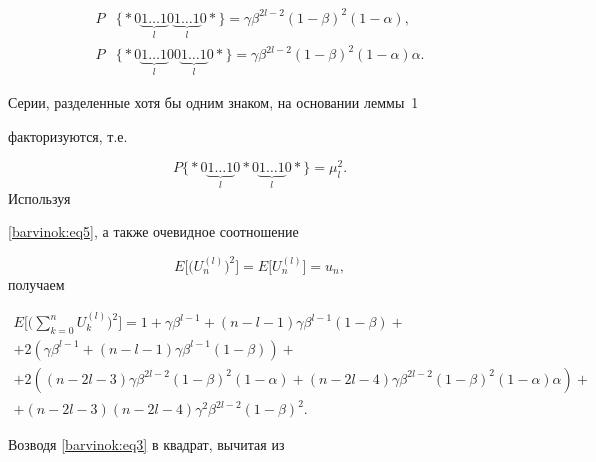 \begin{equation}

\label{barvinok:eq5}

\begin{aligned}

 P & \bigl\{ \ast 0\underbrace {1\ldots 1}_l0\underbrace {1\ldots 1}_l0\ast

\bigr\}=\gamma \beta ^{2l-2}(1-\beta)^2 (1-\alpha ), \\

 P & \bigl\{ \ast 0\underbrace {1 \ldots 1}_l00\underbrace {1\ldots 1}_l0\ast

\bigr\}=\gamma \beta ^{2l-2}(1-\beta)^2 (1-\alpha)\alpha.

\end{aligned}

\end{equation}

Серии, разделенные хотя бы одним знаком, на основании леммы~1

факторизуются, т.е. 

$$P\bigl\{ \ast 0\underbrace {1\ldots 1}_l0\ast

0\underbrace {1\ldots 1}_l0\ast  \bigr\}=\mu _l^2.$$ Используя

\eqref{barvinok:eq5}, а также очевидное соотношение 

$$

E \bigl[\bigl(U_n^{(l)}\bigr)^2 \bigr]=E \bigl[U_n^{(l)}

\bigr]=u_n,

$$ получаем

\begin{multline}

\label{barvinok:eq6} E\biggl[\biggl(\sum\limits_{k=0}^n U_k^{(l)}\biggr)^2 \biggr]=

1+\gamma \beta ^{l-1}+(n-l-1)\gamma \beta ^{l-1} (1-\beta) + \\

+2 \left( \gamma \beta ^{l-1}+ (n-l-1)\gamma \beta^{l-1} (1-\beta) \right)+ \\

+2\left( (n-2l-3)\gamma \beta ^{2l-2}( 1-\beta)^2(1-\alpha)+(n-2l-4)\gamma \beta

^{2l-2}(1-\beta)^2(1-\alpha)\alpha \right)+ \\

 +(n-2l-3)(n-2l-4)\gamma ^2\beta ^{2l-2}(1-\beta)^2.

\end{multline}

Возводя \eqref{barvinok:eq3} в квадрат, вычитая из

